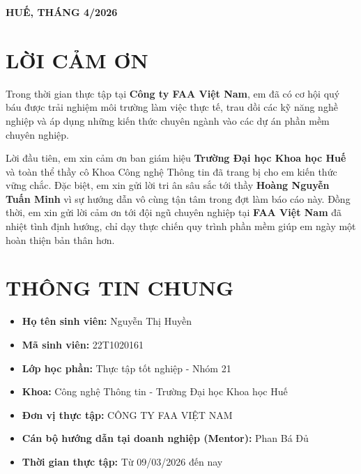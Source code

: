\documentclass[12pt, a4paper]{article}
\begin{document}
\begin{titlepage}
    \vfill
    \begin{center}
        \textbf{HUẾ, THÁNG 4/2026}
    \end{center}
    \restoregeometry
\end{titlepage}

\newpage

\section*{LỜI CẢM ƠN}
Trong thời gian thực tập tại \textbf{Công ty FAA Việt Nam}, em đã có cơ hội quý báu được trải nghiệm môi trường làm việc thực tế, trau dồi các kỹ năng nghề nghiệp và áp dụng những kiến thức chuyên ngành vào các dự án phần mềm chuyên nghiệp. 

Lời đầu tiên, em xin cảm ơn ban giám hiệu \textbf{Trường Đại học Khoa học Huế} và toàn thể thầy cô Khoa Công nghệ Thông tin đã trang bị cho em kiến thức vững chắc. Đặc biệt, em xin gửi lời tri ân sâu sắc tới thầy \textbf{Hoàng Nguyễn Tuấn Minh} vì sự hướng dẫn vô cùng tận tâm trong đợt làm báo cáo này. Đồng thời, em xin gửi lời cảm ơn tới đội ngũ chuyên nghiệp tại \textbf{FAA Việt Nam} đã nhiệt tình định hướng, chỉ dạy thực chiến quy trình phần mềm giúp em ngày một hoàn thiện bản thân hơn.

\newpage
\renewcommand{\contentsname}{MỤC LỤC}
\tableofcontents
\newpage


\section{THÔNG TIN CHUNG}
\begin{itemize}
    \item \textbf{Họ tên sinh viên:} Nguyễn Thị Huyền
    \item \textbf{Mã sinh viên:} 22T1020161
    \item \textbf{Lớp học phần:} Thực tập tốt nghiệp - Nhóm 21
    \item \textbf{Khoa:} Công nghệ Thông tin - Trường Đại học Khoa học Huế
    \item \textbf{Đơn vị thực tập:} CÔNG TY FAA VIỆT NAM
    \item \textbf{Cán bộ hướng dẫn tại doanh nghiệp (Mentor):} Phan Bá Đủ
    \item \textbf{Thời gian thực tập:} Từ 09/03/2026 đến nay
\end{itemize}
\end{document}
